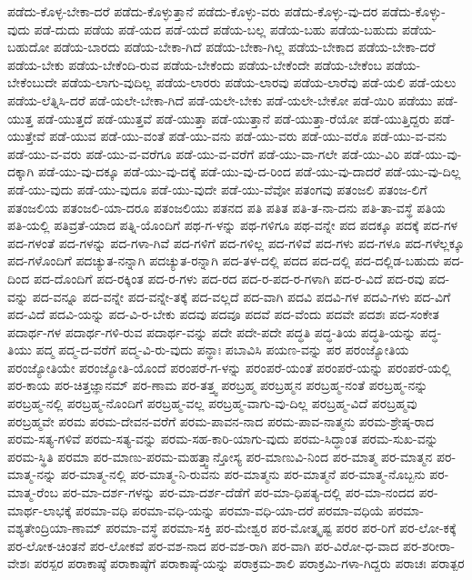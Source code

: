 {ಪಡೆದು-ಕೊಳ್ಳ-ಬೇಕಾ-ದರೆ
ಪಡೆದು-ಕೊಳ್ಳುತ್ತಾನೆ
ಪಡೆದು-ಕೊಳ್ಳು-ವರು
ಪಡೆದು-ಕೊಳ್ಳು-ವು-ದರ
ಪಡೆದು-ಕೊಳ್ಳು-ವುದು
ಪಡೆ-ದುದು
ಪಡೆಯ
ಪಡೆ-ಯದ
ಪಡೆ-ಯದೆ
ಪಡೆಯ-ಬಲ್ಲ
ಪಡೆಯ-ಬಹು
ಪಡೆಯ-ಬಹುದು
ಪಡೆಯ-ಬಹುದೋ
ಪಡೆಯ-ಬಾರದು
ಪಡೆಯ-ಬೇಕಾ-ಗಿದೆ
ಪಡೆಯ-ಬೇಕಾ-ಗಿಲ್ಲ
ಪಡೆಯ-ಬೇಕಾದ
ಪಡೆಯ-ಬೇಕಾ-ದರೆ
ಪಡೆಯ-ಬೇಕು
ಪಡೆಯ-ಬೇಕೆಂದಿ-ರುವ
ಪಡೆಯ-ಬೇಕೆಂದು
ಪಡೆಯ-ಬೇಕೆಂದೇ
ಪಡೆಯ-ಬೇಕೆಂಬ
ಪಡೆಯ-ಬೇಕೆಂಬುದೇ
ಪಡೆಯ-ಲಾಗು-ವುದಿಲ್ಲ
ಪಡೆಯ-ಲಾರರು
ಪಡೆಯ-ಲಾರವು
ಪಡೆಯ-ಲಾರೆವು
ಪಡೆ-ಯಲಿ
ಪಡೆ-ಯಲು
ಪಡೆಯ-ಲೆತ್ನಿಸಿ-ದರೆ
ಪಡೆ-ಯಲೇ-ಬೇಕಾ-ಗಿದೆ
ಪಡೆ-ಯಲೇ-ಬೇಕು
ಪಡೆ-ಯಲೇ-ಬೇಕೋ
ಪಡೆ-ಯಿರಿ
ಪಡೆಯು
ಪಡೆ-ಯುತ್ತ
ಪಡೆ-ಯುತ್ತದೆ
ಪಡೆ-ಯುತ್ತವೆ
ಪಡೆ-ಯುತ್ತಾ
ಪಡೆ-ಯುತ್ತಾನೆ
ಪಡೆ-ಯುತ್ತಾ-ರೆಯೋ
ಪಡೆ-ಯುತ್ತಿದ್ದರು
ಪಡೆ-ಯುತ್ತೇವೆ
ಪಡೆ-ಯುವ
ಪಡೆ-ಯು-ವಂತೆ
ಪಡೆ-ಯು-ವನು
ಪಡೆ-ಯು-ವರು
ಪಡೆ-ಯು-ವರೊ
ಪಡೆ-ಯು-ವ-ವನು
ಪಡೆ-ಯು-ವ-ವರು
ಪಡೆ-ಯು-ವ-ವರೆಗೂ
ಪಡೆ-ಯು-ವ-ವರೆಗೆ
ಪಡೆ-ಯು-ವಾ-ಗಲೇ
ಪಡೆ-ಯು-ವಿರಿ
ಪಡೆ-ಯು-ವು-ದಕ್ಕಾಗಿ
ಪಡೆ-ಯು-ವು-ದಕ್ಕೂ
ಪಡೆ-ಯು-ವು-ದಕ್ಕೆ
ಪಡೆ-ಯು-ವು-ದ-ರಿಂದ
ಪಡೆ-ಯು-ವು-ದಾದರೆ
ಪಡೆ-ಯು-ವು-ದಿಲ್ಲ
ಪಡೆ-ಯು-ವುದು
ಪಡೆ-ಯು-ವುದೂ
ಪಡೆ-ಯು-ವುದೇ
ಪಡೆ-ಯು-ವೆವೋ
ಪತಂಗವು
ಪತಂಜಲಿ
ಪತಂಜ-ಲಿಗೆ
ಪತಂಜಲಿಯ
ಪತಂಜಲಿ-ಯಾ-ದರೂ
ಪತಂಜಲಿಯು
ಪತನದ
ಪತಿ
ಪತಿತ
ಪತಿ-ತ-ನಾ-ದನು
ಪತಿ-ತಾ-ವಸ್ಥೆ
ಪತಿಯ
ಪತಿ-ಯಲ್ಲಿ
ಪತಿವ್ರತೆ-ಯಾದ
ಪತ್ನಿ-ಯೊಂದಿಗೆ
ಪಥ-ಗ-ಳನ್ನು
ಪಥ-ಗಳಿಗೂ
ಪಥ-ವನ್ನೇ
ಪದ
ಪದಕ್ಕೂ
ಪದಕ್ಕೆ
ಪದ-ಗಳ
ಪದ-ಗಳಂತೆ
ಪದ-ಗಳನ್ನು
ಪದ-ಗಳಾ-ಗಿವೆ
ಪದ-ಗಳಿಗೆ
ಪದ-ಗಳಿಲ್ಲ
ಪದ-ಗಳಿವೆ
ಪದ-ಗಳು
ಪದ-ಗಳೂ
ಪದ-ಗಳೆಲ್ಲಕ್ಕೂ
ಪದ-ಗಳೊಂದಿಗೆ
ಪದಚ್ಯುತ-ನನ್ನಾಗಿ
ಪದಚ್ಯುತ-ರನ್ನಾಗಿ
ಪದ-ತಳ-ದಲ್ಲಿ
ಪದದ
ಪದ-ದಲ್ಲಿ
ಪದ-ದಲ್ಲಿಡ-ಬಹುದು
ಪದ-ದಿಂದ
ಪದ-ದೊಂದಿಗೆ
ಪದ-ರಕ್ಕಿಂತ
ಪದ-ರ-ಗಳು
ಪದ-ರದ
ಪದ-ರ-ಪದ-ರ-ಗಳಾಗಿ
ಪದ-ರ-ವಿದೆ
ಪದ-ರವು
ಪದ-ವನ್ನು
ಪದ-ವನ್ನೂ
ಪದ-ವನ್ನೇ
ಪದ-ವನ್ನೇ-ತಕ್ಕೆ
ಪದ-ವಲ್ಲದೆ
ಪದ-ವಾಗಿ
ಪದವಿ
ಪದವಿ-ಗಳ
ಪದವಿ-ಗಳು
ಪದ-ವಿಗೆ
ಪದ-ವಿದೆ
ಪದವಿ-ಯನ್ನು
ಪದ-ವಿ-ರ-ಬೇಕು
ಪದವು
ಪದವೂ
ಪದವೆ
ಪದ-ವೆಂದು
ಪದವೇ
ಪದಶಃ
ಪದ-ಸಂಕೇತ
ಪದಾರ್ಥ-ಗಳ
ಪದಾರ್ಥ-ಗಳಿ-ರುವ
ಪದಾರ್ಥ-ವನ್ನು
ಪದೇ
ಪದೇ-ಪದೇ
ಪದ್ಧತಿ
ಪದ್ಧ-ತಿಯ
ಪದ್ಧತಿ-ಯನ್ನು
ಪದ್ಧ-ತಿಯು
ಪದ್ಮ
ಪದ್ಮ-ದ-ವರೆಗೆ
ಪದ್ಮ-ವಿ-ರು-ವುದು
ಪನ್ಥಾಃ
ಪಬಾವಿಸಿ
ಪಯಣ-ವನ್ನು
ಪರ
ಪರಂಜ್ಯೋತಿಯ
ಪರಂಜ್ಯೋತಿಯೇ
ಪರಂಜ್ಯೋತಿ-ಯೊಂದೆ
ಪರಂಪರೆ-ಗ-ಳನ್ನು
ಪರಂಪರೆ-ಯಂತೆ
ಪರಂಪರೆ-ಯನ್ನು
ಪರಂಪರೆ-ಯಲ್ಲಿ
ಪರ-ಕಾಯ
ಪರ-ಚಿತ್ತಜ್ಞಾನಮ್
ಪರ-ಣಾಮ
ಪರ-ತತ್ತ್ವ
ಪರಬ್ರಹ್ಮ
ಪರಬ್ರಹ್ಮನ
ಪರಬ್ರಹ್ಮ-ನಂತೆ
ಪರಬ್ರಹ್ಮ-ನನ್ನು
ಪರಬ್ರಹ್ಮ-ನಲ್ಲಿ
ಪರಬ್ರಹ್ಮ-ನೊಂದಿಗೆ
ಪರಬ್ರಹ್ಮ-ವಲ್ಲ
ಪರಬ್ರಹ್ಮ-ವಾಗು-ವು-ದಿಲ್ಲ
ಪರಬ್ರಹ್ಮ-ವಿದೆ
ಪರಬ್ರಹ್ಮವು
ಪರಬ್ರಹ್ಮವೇ
ಪರಮ
ಪರಮ-ದೇವನ-ವರೆಗೆ
ಪರಮ-ಪಾವನ-ನಾದ
ಪರಮ-ಪಾವ-ನಾತ್ಮನು
ಪರಮ-ಶ್ರೇಷ್ಠ-ರಾದ
ಪರಮ-ಸತ್ಯ-ಗಳಿವೆ
ಪರಮ-ಸತ್ಯ-ವನ್ನು
ಪರಮ-ಸಹ-ಕಾರಿ-ಯಾಗು-ವುದು
ಪರಮ-ಸಿದ್ಧಾಂತ
ಪರಮ-ಸುಖ-ವನ್ನು
ಪರಮ-ಸ್ಥಿತಿ
ಪರಮಾ
ಪರ-ಮಾಣು-ಪರಮ-ಮಹತ್ತ್ವಾನ್ತೋಸ್ಯ
ಪರ-ಮಾಣುವಿ-ನಿಂದ
ಪರ-ಮಾತ್ಮ
ಪರ-ಮಾತ್ಮನ
ಪರ-ಮಾತ್ಮ-ನನ್ನು
ಪರ-ಮಾತ್ಮ-ನಲ್ಲಿ
ಪರ-ಮಾತ್ಮ-ನಿ-ರುವನು
ಪರ-ಮಾತ್ಮನು
ಪರ-ಮಾತ್ಮನೆ
ಪರ-ಮಾತ್ಮ-ನೊಬ್ಬನು
ಪರ-ಮಾತ್ಮ-ರೆಂಬ
ಪರ-ಮಾ-ದರ್ಶ-ಗಳನ್ನು
ಪರ-ಮಾ-ದರ್ಶ-ದೆಡೆಗೆ
ಪರ-ಮಾ-ಧಿಪತ್ಯ-ದಲ್ಲಿ
ಪರ-ಮಾ-ನಂದದ
ಪರ-ಮಾರ್ಥ-ಲಾಭಕ್ಕೆ
ಪರಮಾ-ವಧಿ
ಪರಮಾ-ವಧಿ-ಯನ್ನು
ಪರಮಾ-ವಧಿ-ಯಾ-ದರೆ
ಪರಮಾ-ವಧಿಯೆ
ಪರಮಾ-ವಶ್ಯತೇಂದ್ರಿಯಾ-ಣಾಮ್
ಪರಮಾ-ವಸ್ಥೆ
ಪರಮಾ-ಸಕ್ತಿ
ಪರ-ಮೇಶ್ವರ
ಪರ-ಮೋತ್ಕೃಷ್ಟ
ಪರರ
ಪರ-ರಿಗೆ
ಪರ-ಲೋ-ಕಕ್ಕೆ
ಪರ-ಲೋಕ-ಚಿಂತನೆ
ಪರ-ಲೋಕವೆ
ಪರ-ವಶ-ನಾದ
ಪರ-ವಶ-ರಾಗಿ
ಪರ-ವಾಗಿ
ಪರ-ವಿರೋ-ಧ-ವಾದ
ಪರ-ಶರೀರಾ-ವೇಶಃ
ಪರಸ್ಪರ
ಪರಾಕಾಷ್ಠೆ
ಪರಾಕಾಷ್ಠೆಗೆ
ಪರಾಕಾಷ್ಠೆ-ಯನ್ನು
ಪರಾಕ್ರಮ-ಶಾಲಿ
ಪರಾಕ್ರಮಿ-ಗಳಾ-ಗಿದ್ದರು
ಪರಾಚಃ
ಪರಾತ್ಪರ
}
